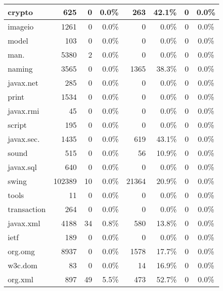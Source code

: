 \begin{table}[t]
\begin{SmallOut}
\begin {tabular} {|p{3.6em}|r|r|r|r|r|c|c|}
\hline
crypto        &  \hfill 625   &  0    &  0.0\%  &  263  &  42.1\%  &  0    & 0.0\%\\
\hline
imageio      &  \hfill 1261   &  0    &  0.0\%  &  0    &  0.0\%  & 0      & 0.0\%\\
\hline
model       &  \hfill 103    & 0     &  0.0\%  & 0     &  0.0\%  & 0    & 0.0\%\\
\hline
man.   &  \hfill 5380   & 2    &   0.0\%  & 0     &  0.0\%  & 0    & 0.0\%  \\
\hline
naming       &  \hfill 3565   & 0    &   0.0\%  & 1365   &  38.3\%  &  0    & 0.0\%  \\
\hline
javax.net           &  \hfill 285    & 0     &  0.0\%  &  0     &  0.0\%   &  0   & 0.0\%\\
\hline
print         &  \hfill 1534   & 0     &  0.0\%  &  0    &  0.0\%   &  0   & 0.0\% \\
\hline
javax.rmi           &  \hfill 45     &  0    &  0.0\%  & 0     &  0.0\%   & 0   & 0.0\%\\
\hline
script         &  \hfill 195   & 0     &  0.0\% &  0     &  0.0\%  & 0  & 0.0\%\\
\hline
javax.sec.       &  \hfill 1435  & 0     &  0.0\%  & 619     &  43.1\%  & 0    & 0.0\%\\
\hline
sound          &  \hfill 515   & 0    &  0.0\%  & 56    &  10.9\%  & 0   & 0.0\%  \\
\hline
javax.sql            &  \hfill 640   & 0    &  0.0\%  & 0     &  0.0\%   & 0   & 0.0\%  \\
\hline
swing          &  102389& 10   &  0.0\%  &  21364 &  20.9\%   &  0   & 0.0\%\\
\hline
tools          &  \hfill 11    & 0     &  0.0\%  &  0    &  0.0\%   &  0   & 0.0\% \\
\hline
transaction    &  \hfill 264   &  0    &  0.0\%  & 0     &  0.0\%   & 0   & 0.0\%\\
\hline
javax.xml            &  \hfill 4188  &  34   &  0.8\% &  580   &  13.8\%  & 0  & 0.0\%\\
\hline
ietf        & \hfill  189   & 0     &  0.0\%  & 0     &  0.0\%  & 0    & 0.0\%\\
\hline
org.omg              &  \hfill 8937   & 0    &  0.0\%  & 1578  &  17.7\%  & 0   & 0.0\%  \\
\hline
w3c.dom          &  \hfill 83     & 0    &  0.0\%  & 14     &  16.9\%   & 0   & 0.0\%  \\
\hline
org.xml             &   \hfill 897    & 49   &  5.5\%  & 473    & 52.7\%    & 0   & 0.0\%\\
\hline
\end{tabular}\vspace*{-2ex}
 \label{table:package}
\end{SmallOut}\vspace*{-2ex}
\end{table}

